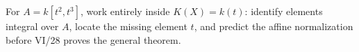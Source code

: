 \begin{problem}\label{chal:vi27-05}
For $A=k[t^2,t^3]$, work entirely inside $K(X)=k(t)$: identify elements integral over $A$, locate the missing element $t$, and predict the affine normalization before VI/28 proves the general theorem.
\end{problem}
